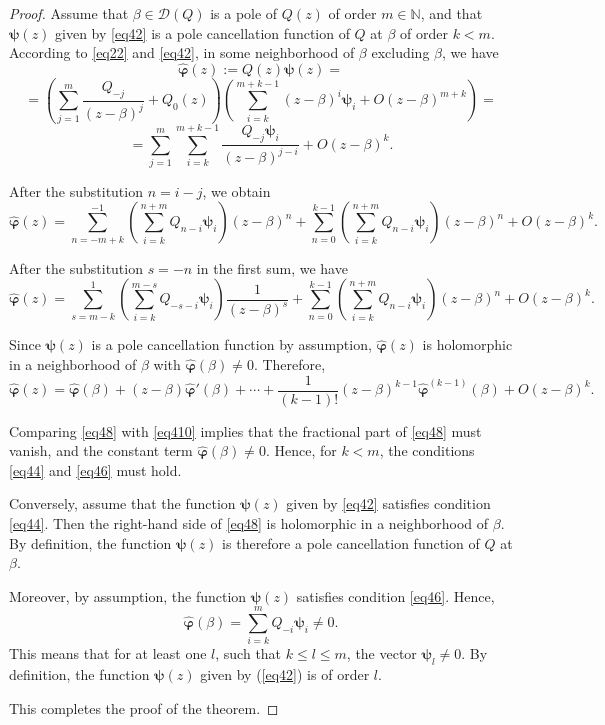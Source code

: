 \documentclass[11pt, reqno]{amsart}
\theoremstyle{plain}
\theoremstyle{remark}
\numberwithin{equation}{section}
\begin{document}
\begin{proof}
Assume that $\beta \in \mathcal{D}(Q)$ is a pole of $Q(z)$ of order $m \in \mathbb{N}$, and that $\boldsymbol{\psi}(z)$ given by \eqref{eq42} is a pole cancellation function of $Q$ at $\beta$ of order $k < m$. According to \eqref{eq22} and \eqref{eq42}, in some neighborhood of $\beta$ excluding $\beta$, we have
\[
\boldsymbol{\hat{\varphi}}(z) := Q(z) \boldsymbol{\psi}(z) =
\]
\[
= \left( \sum_{j=1}^{m} \frac{Q_{-j}}{(z-\beta)^j} + Q_{0}(z) \right) 
\left( \sum_{i=k}^{m+k-1} (z - \beta)^{i} \boldsymbol{\psi}_{i} + O(z - \beta)^{m+k} \right) =
\]
\[
= \sum_{j=1}^{m} \sum_{i=k}^{m+k-1} \frac{Q_{-j} \boldsymbol{\psi}_{i}}{(z-\beta)^{j-i}} + O(z - \beta)^{k}.
\]

After the substitution $n = i - j$, we obtain
\[
\boldsymbol{\hat{\varphi}}(z) = \sum_{n=-m+k}^{-1} \left( \sum_{i=k}^{n+m} Q_{n-i} \boldsymbol{\psi}_{i} \right) (z - \beta)^{n} 
+ \sum_{n=0}^{k-1} \left( \sum_{i=k}^{n+m} Q_{n-i} \boldsymbol{\psi}_{i} \right) (z - \beta)^{n} + O(z - \beta)^{k}.
\]

After the substitution $s = -n$ in the first sum, we have
\begin{equation}\label{eq48}
\boldsymbol{\hat{\varphi}}(z) = \sum_{s=m-k}^{1} \left( \sum_{i=k}^{m-s} Q_{-s-i} \boldsymbol{\psi}_{i} \right) \frac{1}{(z - \beta)^{s}}
+ \sum_{n=0}^{k-1} \left( \sum_{i=k}^{n+m} Q_{n-i} \boldsymbol{\psi}_{i} \right) (z - \beta)^{n} + O(z - \beta)^{k}.
\end{equation}

Since $\boldsymbol{\psi}(z)$ is a pole cancellation function by assumption, $\boldsymbol{\hat{\varphi}}(z)$ is holomorphic in a neighborhood of $\beta$ with $\boldsymbol{\hat{\varphi}}(\beta) \neq 0$. Therefore,
\begin{equation}\label{eq410}
\boldsymbol{\hat{\varphi}}(z) = \boldsymbol{\hat{\varphi}}(\beta) + (z-\beta)\boldsymbol{\hat{\varphi}}'(\beta) + \cdots + \frac{1}{(k-1)!}(z-\beta)^{k-1} \boldsymbol{\hat{\varphi}}^{(k-1)}(\beta) + O(z-\beta)^{k}.
\end{equation}

Comparing \eqref{eq48} with \eqref{eq410} implies that the fractional part of \eqref{eq48} must vanish, and the constant term $\boldsymbol{\hat{\varphi}}(\beta) \neq 0$. Hence, for $k < m$, the conditions \eqref{eq44} and \eqref{eq46} must hold. 

Conversely, assume that the function $\boldsymbol{\psi}(z)$ given by \eqref{eq42} satisfies condition \eqref{eq44}. Then the right-hand side of \eqref{eq48} is holomorphic in a neighborhood of $\beta$. By definition, the function $\boldsymbol{\psi}(z)$ is therefore a pole cancellation function of $Q$ at $\beta$.

Moreover, by assumption, the function $\boldsymbol{\psi}(z)$ satisfies condition \eqref{eq46}. Hence, 
\[
\boldsymbol{\hat{\varphi}}(\beta) = \sum_{i=k}^{m} Q_{-i} \boldsymbol{\psi}_{i} \neq 0.
\]
This means that for at least one $l$, such that $k \le l \le m$, the vector $\boldsymbol{\psi}_{l} \neq 0 $. By definition, the function $\boldsymbol{\psi}(z)$ given by (\ref{eq42}) is of order $l$.  

This completes the proof of the theorem.
\end{proof} 
\end{document}
